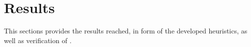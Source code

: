 \section{Results}
\label{results}
This sections provides the results reached, in form of the developed heuristics, as well as verification of \qs{}.

